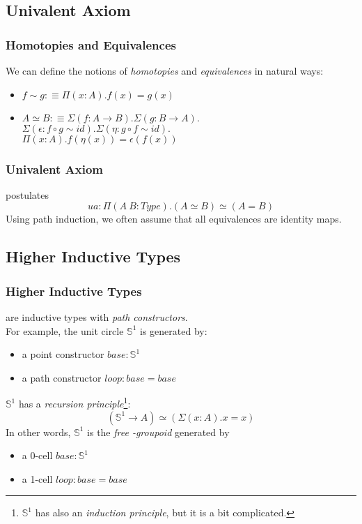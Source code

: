 \documentclass{beamer}
\begin{document}
\subsection{Univalent Axiom}

\begin{frame}
  \frametitle{Homotopies and Equivalences}
  We can define the notions of {\it homotopies} and {\it equivalences}
  in natural ways:
  \begin{itemize}
    \item
    $f \sim g :\equiv \Pi \left( x : A \right) .
    f \left( x \right) = g \left( x \right)$
    \item
    $A \simeq B :\equiv \Sigma \left( f : A \to B \right) .
    \Sigma \left( g : B \to A \right) .$ \\
    $\Sigma \left( \epsilon : f \circ g \sim id \right) .
    \Sigma \left( \eta : g \circ f \sim id \right) .$ \\
    $\Pi \left( x : A \right) .
    f \left( \eta \left( x \right) \right) = \epsilon \left( f \left( x \right) \right)$
  \end{itemize}
\end{frame}

\begin{frame}
  \frametitle{Univalent Axiom}
  postulates
  $$
  ua : \Pi \left( A \ B : Type \right) .
  \left( A \simeq B \right) \simeq \left( A = B \right)
  $$
  Using path induction,
  we often assume that all equivalences are identity maps.
\end{frame}

\subsection{Higher Inductive Types}

\begin{frame}
  \frametitle{Higher Inductive Types}
  are inductive types with {\it path constructors}. \\
  For example, the unit circle ${\mathbb S}^1$ is generated by:
  \begin{itemize}
    \item a point constructor $base : {\mathbb S}^1$
    \item a path constructor $loop : base = base$
  \end{itemize}
  ${\mathbb S}^1$ has a {\it recursion principle}\footnote{
    ${\mathbb S}^1$ has also an {\it induction principle},
    but it is a bit complicated.}:
  $$
  \left( {\mathbb S}^1 \to A \right) \simeq
  \left( \Sigma \left( x : A \right) . x = x \right)
  $$
  In other words, ${\mathbb S}^1$ is the {\it free \omega-groupoid}
  generated by
  \begin{itemize}
    \item a 0-cell $base : {\mathbb S}^1$
    \item a 1-cell $loop : base = base$
  \end{itemize}
\end{frame}
\end{document}
